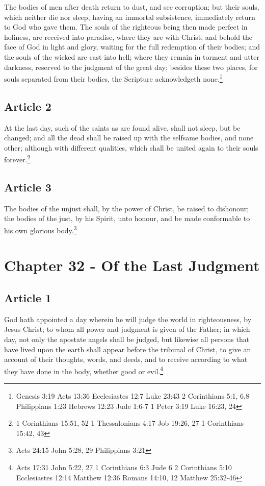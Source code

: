\documentclass[12pt,letterpaper]{book}
\begin{document}
The bodies of men after death return to dust, and see corruption; but their souls, which neither die nor sleep, having an immortal subsistence, immediately return to God who gave them. The souls of the righteous being then made perfect in holiness, are received into paradise, where they are with Christ, and behold the face of God in light and glory, waiting for the full redemption of their bodies; and the souls of the wicked are cast into hell; where they remain in torment and utter darkness, reserved to the judgment of the great day; besides these two places, for souls separated from their bodies, the Scripture acknowledgeth none.\footnote{Genesis 3:19 Acts 13:36 Ecclesiastes 12:7 Luke 23:43 2 Corinthians 5:1, 6,8 Philippians 1:23 Hebrews 12:23 Jude 1:6-7 1 Peter 3:19 Luke 16:23, 24}

\section{Article 2}

At the last day, such of the saints as are found alive, shall not sleep, but be changed; and all the dead shall be raised up with the selfsame bodies, and none other; although with different qualities, which shall be united again to their souls forever.\footnote{1 Corinthians 15:51, 52 1 Thessalonians 4:17 Job 19:26, 27 1 Corinthians 15:42, 43}

\section{Article 3}

The bodies of the unjust shall, by the power of Christ, be raised to dishonour; the bodies of the just, by his Spirit, unto honour, and be made conformable to his own glorious body.\footnote{Acts 24:15 John 5:28, 29 Philippians 3:21}

\chapter{Chapter 32 - Of the Last Judgment}
\section{Article 1}

God hath appointed a day wherein he will judge the world in righteousness, by Jesus Christ; to whom all power and judgment is given of the Father; in which day, not only the apostate angels shall be judged, but likewise all persons that have lived upon the earth shall appear before the tribunal of Christ, to give an account of their thoughts, words, and deeds, and to receive according to what they have done in the body, whether good or evil.\footnote{Acts 17:31 John 5:22, 27 1 Corinthians 6:3 Jude 6 2 Corinthians 5:10 Ecclesiastes 12:14 Matthew 12:36 Romans 14:10, 12 Matthew 25:32-46}
\end{document}
